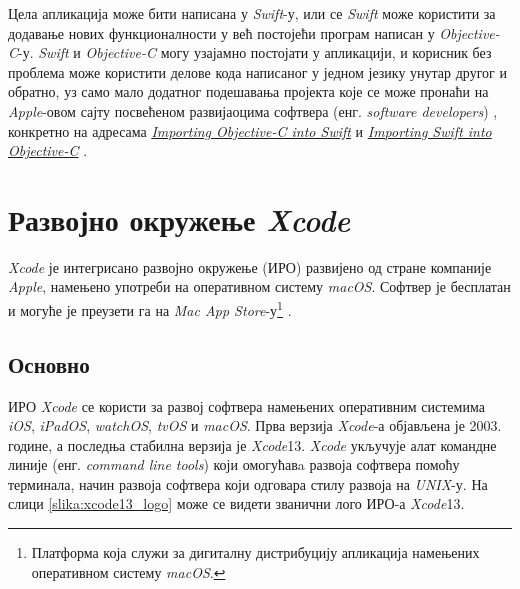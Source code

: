 \documentclass[12pt,oneside]{memoir}
\begin{document}
\indent Цела апликација може бити написана у \textit{Swift}-у, или се \textit{Swift} може користити за додавање нових функционалности у већ постојећи програм написан у \textit{Objective-C}-у. \textit{Swift} и \textit{Objective-C} могу узајамно постојати у апликацији, и корисник без проблема може користити делове кода написаног у једном језику унутар другог и обратно, уз само мало додатног подешавања пројекта које се може пронаћи на \textit{Apple}-овом сајту посвећеном развијаоцима софтвера (енг. \textit{software developers}) \cite{Apple_Developer}, конкретно на адресама \href{https://developer.apple.com/documentation/swift/imported_c_and_objective-c_apis/importing_objective-c_into_swift}{\textit{Importing Objective-C into Swift}} \cite{Importing_Objective-C_into_Swift} и \href{https://developer.apple.com/documentation/swift/imported_c_and_objective-c_apis/importing_swift_into_objective-c}{\textit{Importing Swift into Objective-C}} \cite{Importing_Swift_into_Objective-C}.

\section{Развојно окружење \textit{Xcode}}
\label{sec:Xcode}

\indent \textit{Xcode} је интегрисано развојно окружење (ИРО) развијено од стране компаније \textit{Apple}, намењено употреби на оперативном систему \textit{macOS}. Софтвер је бесплатан и могуће је преузети га на \textit{Mac App Store}-у\footnote{Платформа која служи за дигиталну дистрибуцију апликација намењених оперативном систему \textit{macOS}.} \cite{Xcode}.

\subsection{Основно}

\indent ИРО \textit{Xcode} се користи за развој софтвера намењених оперативним системима \textit{iOS}, \textit{iPadOS}, \textit{watchOS}, \textit{tvOS} и \textit{macOS}. Прва верзија \textit{Xcode}-а објављена је 2003. године, а последња стабилна верзија је \textit{Xcode}13. \textit{Xcode} укључује алат командне линије (енг. \textit{command line tools}) који омогућавa развоја софтвера помоћу терминала, начин развоја софтвера који одговара стилу развоја на \textit{UNIX}-у. На слици \ref{slika:xcode13_logo} може се видети званични лого ИРО-а \textit{Xcode}13.
\end{document}
